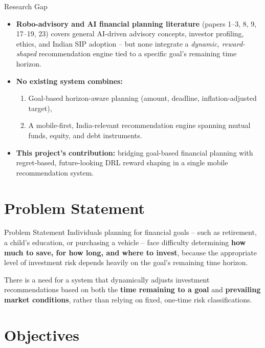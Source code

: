 \documentclass{beamer}
\begin{document}
\begin{frame}{Research Gap}
\small
\begin{itemize}
    \item \textbf{Robo-advisory and AI financial planning literature} (papers 1--3, 8, 9, 17--19, 23) covers general AI-driven advisory concepts, investor profiling, ethics, and Indian SIP adoption -- but none integrate a \emph{dynamic, reward-shaped} recommendation engine tied to a specific goal's remaining time horizon.
    \item \textbf{No existing system combines:}
    \begin{enumerate}
        \item Goal-based horizon-aware planning (amount, deadline, inflation-adjusted target),
        \item A mobile-first, India-relevant recommendation engine spanning mutual funds, equity, and debt instruments.
    \end{enumerate}
    \item \textbf{This project's contribution:} bridging goal-based financial planning with regret-based, future-looking DRL reward shaping in a single mobile recommendation system.
\end{itemize}
\end{frame}

\section{Problem Statement}

\begin{frame}{Problem Statement}
\small
Individuals planning for financial goals -- such as retirement, a child's education, or purchasing a vehicle -- face difficulty determining \textbf{how much to save, for how long, and where to invest}, because the appropriate level of investment risk depends heavily on the goal's remaining time horizon.

\medskip
There is a need for a system that dynamically adjusts investment recommendations based on both the \textbf{time remaining to a goal} and \textbf{prevailing market conditions}, rather than relying on fixed, one-time risk classifications.
\end{frame}

\section{Objectives}
\end{document}

